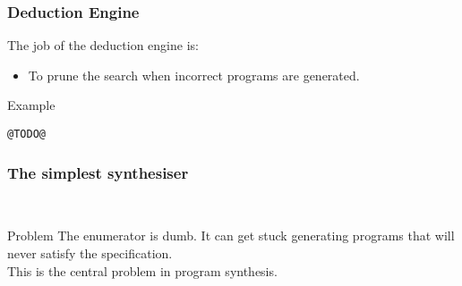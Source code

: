 \documentclass{beamer}
\theoremstyle{definition} %
\begin{document}
\begin{frame}[fragile]
    \frametitle{Deduction Engine}

	The job of the deduction engine is:

	\begin{itemize}
		\item To prune the search when incorrect programs are generated.
	\end{itemize}

	\begin{exampleblock}{Example}
		\begin{lstlisting}[style=imp]
@TODO@
		\end{lstlisting}
	\end{exampleblock}

\end{frame}

\begin{frame}
    \frametitle{The simplest synthesiser}

	\centering
    ~\\

	\pause

	\begin{alertblock}{Problem}
		The enumerator is dumb. It can get stuck generating programs that will never satisfy the specification.\\
		This is the central problem in program synthesis.
	\end{alertblock}

\end{frame}
\end{document}

